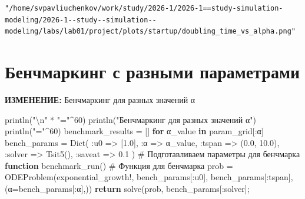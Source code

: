 \documentclass[
  english,
  russian,
  12pt,
  a4paper,
  DIV=11,
  numbers=noendperiod]{scrreprt}
\newenvironment{Shaded}{\begin{snugshade}}{\end{snugshade}}
\newcommand{\CommentTok}[1]{\textcolor[rgb]{0.37,0.37,0.37}{#1}}
\newcommand{\ControlFlowTok}[1]{\textcolor[rgb]{0.00,0.23,0.31}{\textbf{#1}}}
\newcommand{\FloatTok}[1]{\textcolor[rgb]{0.68,0.00,0.00}{#1}}
\newcommand{\FunctionTok}[1]{\textcolor[rgb]{0.28,0.35,0.67}{#1}}
\newcommand{\KeywordTok}[1]{\textcolor[rgb]{0.00,0.23,0.31}{\textbf{#1}}}
\newcommand{\NormalTok}[1]{\textcolor[rgb]{0.00,0.23,0.31}{#1}}
\newcommand{\OperatorTok}[1]{\textcolor[rgb]{0.37,0.37,0.37}{#1}}
\newcommand{\SpecialCharTok}[1]{\textcolor[rgb]{0.37,0.37,0.37}{#1}}
\newcommand{\StringTok}[1]{\textcolor[rgb]{0.13,0.47,0.30}{#1}}
\begin{document}
\begin{verbatim}
"/home/svpavliuchenkov/work/study/2026-1/2026-1==study-simulation-modeling/2026-1--study--simulation--modeling/labs/lab01/project/plots/startup/doubling_time_vs_alpha.png"
\end{verbatim}

\section{Бенчмаркинг с разными
параметрами}\label{ux431ux435ux43dux447ux43cux430ux440ux43aux438ux43dux433-ux441-ux440ux430ux437ux43dux44bux43cux438-ux43fux430ux440ux430ux43cux435ux442ux440ux430ux43cux438}

\textbf{ИЗМЕНЕНИЕ:} Бенчмаркинг для разных значений α

\begin{Shaded}
\begin{Highlighting}[]
\FunctionTok{println}\NormalTok{(}\StringTok{"}\SpecialCharTok{\textbackslash{}n}\StringTok{"} \OperatorTok{*} \StringTok{"="}\OperatorTok{\^{}}\FloatTok{60}\NormalTok{)}
\FunctionTok{println}\NormalTok{(}\StringTok{"Бенчмаркинг для разных значений α"}\NormalTok{)}
\FunctionTok{println}\NormalTok{(}\StringTok{"="}\OperatorTok{\^{}}\FloatTok{60}\NormalTok{)}
\NormalTok{benchmark\_results }\OperatorTok{=}\NormalTok{ []}
\ControlFlowTok{for}\NormalTok{ α\_value }\KeywordTok{in}\NormalTok{ param\_grid[}\OperatorTok{:}\NormalTok{α]}
\NormalTok{bench\_params }\OperatorTok{=} \FunctionTok{Dict}\NormalTok{(}
\OperatorTok{:}\NormalTok{u0 }\OperatorTok{=\textgreater{}}\NormalTok{ [}\FloatTok{1.0}\NormalTok{],}
\OperatorTok{:}\NormalTok{α }\OperatorTok{=\textgreater{}}\NormalTok{ α\_value,}
\OperatorTok{:}\NormalTok{tspan }\OperatorTok{=\textgreater{}}\NormalTok{ (}\FloatTok{0.0}\NormalTok{, }\FloatTok{10.0}\NormalTok{),}
\OperatorTok{:}\NormalTok{solver }\OperatorTok{=\textgreater{}} \FunctionTok{Tsit5}\NormalTok{(),}
\OperatorTok{:}\NormalTok{saveat }\OperatorTok{=\textgreater{}} \FloatTok{0.1}
\NormalTok{) }\CommentTok{\# Подготавливаем параметры для бенчмарка}
\KeywordTok{function} \FunctionTok{benchmark\_run}\NormalTok{() }\CommentTok{\# Функция для бенчмарка}
\NormalTok{prob }\OperatorTok{=} \FunctionTok{ODEProblem}\NormalTok{(exponential\_growth!,}
\NormalTok{bench\_params[}\OperatorTok{:}\NormalTok{u0],}
\NormalTok{bench\_params[}\OperatorTok{:}\NormalTok{tspan],}
\NormalTok{(α}\OperatorTok{=}\NormalTok{bench\_params[}\OperatorTok{:}\NormalTok{α],))}
\ControlFlowTok{return} \FunctionTok{solve}\NormalTok{(prob, bench\_params[}\OperatorTok{:}\NormalTok{solver];}

\end{Highlighting}
\end{Shaded}
\end{document}
